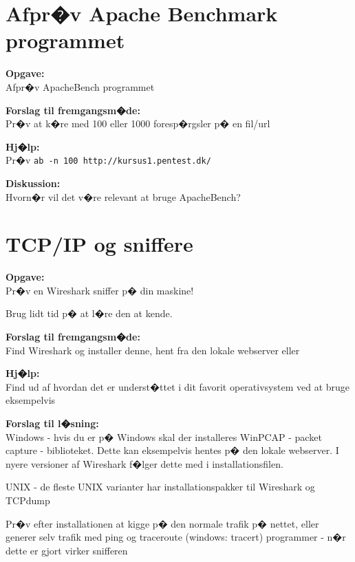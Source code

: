 \documentclass[a4paper,11pt,notitlepage]{oevelser}
\begin{document}
\chapter{Afpr�v Apache Benchmark programmet}
\label{ex:apache-benchmark}

{\bfseries Opgave:}\\
Afpr�v ApacheBench programmet

{\bfseries Forslag til fremgangsm�de:}\\
Pr�v at k�re med 100 eller 1000 foresp�rgsler p� en fil/url

{\bfseries Hj�lp:}\\
Pr�v \verb+ab -n 100 http://kursus1.pentest.dk/+


{\bfseries Diskussion:}\\
Hvorn�r vil det v�re relevant at bruge ApacheBench?

\chapter{TCP/IP og sniffere}
\label{ex:wireshark}


{\bfseries Opgave:}\\
Pr�v en Wireshark sniffer p� din maskine!

Brug lidt tid p� at l�re den at kende.

{\bfseries Forslag til fremgangsm�de:}\\
Find Wireshark og installer denne, hent fra den lokale webserver eller 

{\bfseries Hj�lp:}\\
Find ud af hvordan det er underst�ttet i dit favorit operativsystem
ved at bruge eksempelvis 

{\bfseries Forslag til l�sning:}\\
Windows - hvis du er p� Windows skal der
installeres WinPCAP - packet capture - biblioteket. Dette kan
eksempelvis hentes p� den lokale webserver. I nyere versioner af
Wireshark f�lger dette med i installationsfilen.


UNIX - de fleste UNIX varianter har installationspakker til Wireshark
og TCPdump

Pr�v efter installationen at kigge p� den normale trafik p� nettet,
eller generer selv trafik med ping og traceroute (windows: tracert)
programmer
- n�r dette er gjort virker snifferen
\end{document}
